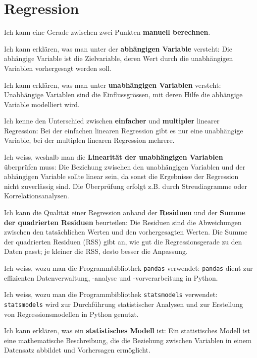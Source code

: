 \section{Regression}
\begin{todolist}
	\item Ich kann eine Gerade zwischen zwei Punkten \textbf{manuell berechnen}.
	\item Ich kann erklären, was man unter der \textbf{abhängigen Variable} versteht: Die abhängige Variable ist die Zielvariable, deren Wert durch die unabhängigen Variablen vorhergesagt werden soll.
	\item Ich kann erklären, was man unter \textbf{unabhängigen Variablen} versteht: Unabhängige Variablen sind die Einflussgrössen, mit deren Hilfe die abhängige Variable modelliert wird.
	\item Ich kenne den Unterschied zwischen \textbf{einfacher} und \textbf{multipler} linearer Regression: Bei der einfachen linearen Regression gibt es nur eine unabhängige Variable, bei der multiplen linearen Regression mehrere.
	\item Ich weiss, weshalb man die \textbf{Linearität der unabhängigen Variablen} überprüfen muss: Die Beziehung zwischen den unabhängigen Variablen und der abhängigen Variable sollte linear sein, da sonst die Ergebnisse der Regression nicht zuverlässig sind. Die Überprüfung erfolgt z.B. durch Streudiagramme oder Korrelationsanalysen.
	\item Ich kann die Qualität einer Regression anhand der \textbf{Residuen} und der \textbf{Summe der quadrierten Residuen} beurteilen: Die Residuen sind die Abweichungen zwischen den tatsächlichen Werten und den vorhergesagten Werten. Die Summe der quadrierten Residuen (RSS) gibt an, wie gut die Regressionsgerade zu den Daten passt; je kleiner die RSS, desto besser die Anpassung.
	\item Ich weiss, wozu man die Programmbibliothek \texttt{pandas} verwendet: \texttt{pandas} dient zur effizienten Datenverwaltung, -analyse und -vorverarbeitung in Python.
	\item Ich weiss, wozu man die Programmbibliothek \texttt{statsmodels} verwendet: \texttt{statsmodels} wird zur Durchführung statistischer Analysen und zur Erstellung von Regressionsmodellen in Python genutzt.
	\item Ich kann erklären, was ein \textbf{statistisches Modell} ist: Ein statistisches Modell ist eine mathematische Beschreibung, die die Beziehung zwischen Variablen in einem Datensatz abbildet und Vorhersagen ermöglicht.
\end{todolist}

